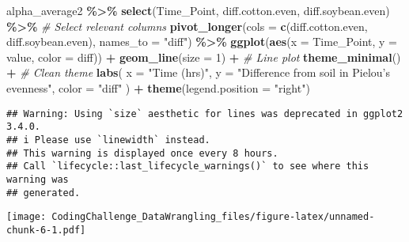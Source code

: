 \documentclass[
]{article}
\newenvironment{Shaded}{\begin{snugshade}}{\end{snugshade}}
\newcommand{\AttributeTok}[1]{\textcolor[rgb]{0.13,0.29,0.53}{#1}}
\newcommand{\CommentTok}[1]{\textcolor[rgb]{0.56,0.35,0.01}{\textit{#1}}}
\newcommand{\DecValTok}[1]{\textcolor[rgb]{0.00,0.00,0.81}{#1}}
\newcommand{\FunctionTok}[1]{\textcolor[rgb]{0.13,0.29,0.53}{\textbf{#1}}}
\newcommand{\NormalTok}[1]{#1}
\newcommand{\SpecialCharTok}[1]{\textcolor[rgb]{0.81,0.36,0.00}{\textbf{#1}}}
\newcommand{\StringTok}[1]{\textcolor[rgb]{0.31,0.60,0.02}{#1}}
\begin{document}
\begin{Shaded}
\begin{Highlighting}[]
\NormalTok{alpha\_average2 }\SpecialCharTok{\%\textgreater{}\%}
  \FunctionTok{select}\NormalTok{(Time\_Point, diff.cotton.even, diff.soybean.even) }\SpecialCharTok{\%\textgreater{}\%}  \CommentTok{\# Select relevant columns}
  \FunctionTok{pivot\_longer}\NormalTok{(}\AttributeTok{cols =} \FunctionTok{c}\NormalTok{(diff.cotton.even, diff.soybean.even), }\AttributeTok{names\_to =} \StringTok{"diff"}\NormalTok{) }\SpecialCharTok{\%\textgreater{}\%}
  \FunctionTok{ggplot}\NormalTok{(}\FunctionTok{aes}\NormalTok{(}\AttributeTok{x =}\NormalTok{ Time\_Point, }\AttributeTok{y =}\NormalTok{ value, }\AttributeTok{color =}\NormalTok{ diff)) }\SpecialCharTok{+}
  \FunctionTok{geom\_line}\NormalTok{(}\AttributeTok{size =} \DecValTok{1}\NormalTok{) }\SpecialCharTok{+}  \CommentTok{\# Line plot}
  \FunctionTok{theme\_minimal}\NormalTok{() }\SpecialCharTok{+}  \CommentTok{\# Clean theme}
  \FunctionTok{labs}\NormalTok{(}
    \AttributeTok{x =} \StringTok{"Time (hrs)"}\NormalTok{,}
    \AttributeTok{y =} \StringTok{"Difference from soil in Pielou’s evenness"}\NormalTok{,}
    \AttributeTok{color =} \StringTok{"diff"}
\NormalTok{  ) }\SpecialCharTok{+} 
  \FunctionTok{theme}\NormalTok{(}\AttributeTok{legend.position =} \StringTok{"right"}\NormalTok{)}
\end{Highlighting}
\end{Shaded}

\begin{verbatim}
## Warning: Using `size` aesthetic for lines was deprecated in ggplot2 3.4.0.
## i Please use `linewidth` instead.
## This warning is displayed once every 8 hours.
## Call `lifecycle::last_lifecycle_warnings()` to see where this warning was
## generated.
\end{verbatim}

\texttt{[image: CodingChallenge\_DataWrangling\_files/figure-latex/unnamed-chunk-6-1.pdf]}
\end{document}
